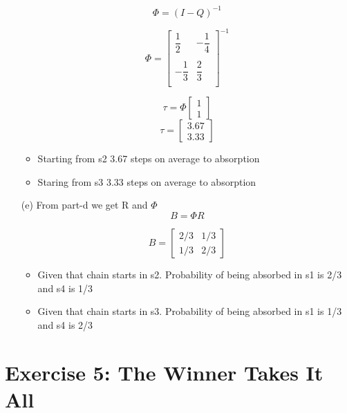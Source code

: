 \documentclass[unicode,11pt,a4paper,oneside,numbers=endperiod,openany]{scrartcl}
\begin{document}
\begin{itemize}
   \[ \Phi = (I - Q)^{-1}
   \]
   
   \[ \Phi = 
        \begin{bmatrix}
                \dfrac{1}{2} & -\dfrac{1}{4}\\
                \\
                -\dfrac{1}{3} & \dfrac{2}{3}\\
        \end{bmatrix}^{-1}
   \]
   
   \[ \tau = \Phi
        \begin{bmatrix}
                1\\
                1
        \end{bmatrix}
   \]
   \[ \tau =
        \begin{bmatrix}
                3.67\\
                3.33
        \end{bmatrix}
   \]
   \begin{itemize}
       \item Starting from s2 3.67 steps on average to absorption
       \item Staring from s3 3.33 steps on average to absorption
   \end{itemize}
   
	
	\item [(e)]
	{From part-d we get R and $\Phi$}\\
	\[ B = \Phi R
    \]
    
    \[ B = 
        \begin{bmatrix}
                2/3 & 1/3\\
                1/3 & 2/3
        \end{bmatrix}
    \]
    
    \begin{itemize}
        \item Given that chain starts in s2. Probability of being absorbed in s1 is 2/3 and s4 is 1/3
         \item Given that chain starts in s3. Probability of being absorbed in s1 is 1/3 and s4 is 2/3
    \end{itemize}
	
	
\end{itemize}



\section*{Exercise 5: The Winner Takes It All}
\end{document}
